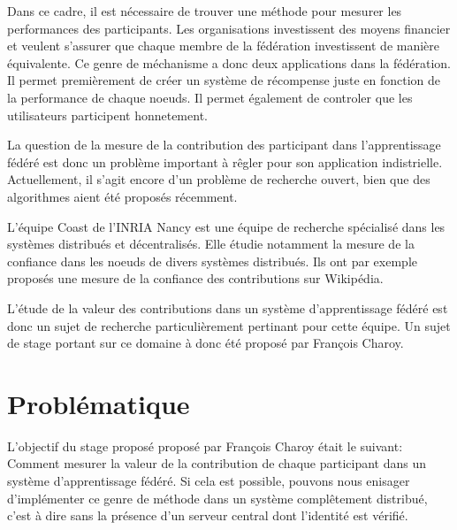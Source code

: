 \documentclass[stage3a]{tnreport} %
\begin{document}
Dans ce cadre, il est nécessaire de trouver une méthode pour mesurer les performances des participants. Les organisations investissent des moyens financier et veulent s'assurer que chaque membre de la fédération investissent de manière équivalente.  Ce genre de méchanisme a donc deux applications dans la fédération. Il permet premièrement de créer un système de récompense juste en fonction de la performance de chaque noeuds. Il permet également de controler que les utilisateurs participent honnetement.

La question de la mesure de la contribution des participant dans l'apprentissage fédéré est donc un problème important à rêgler pour son application indistrielle. Actuellement, il s'agit encore d'un problème de recherche ouvert, bien que des algorithmes aient été proposés récemment.


L'équipe Coast de l'INRIA Nancy est une équipe de recherche spécialisé dans les systèmes distribués et décentralisés. Elle étudie notamment la mesure de la confiance dans les noeuds de divers systèmes distribués. Ils ont par exemple proposés une mesure de la confiance des contributions sur Wikipédia.

L'étude de la valeur des contributions dans un système d'apprentissage fédéré est donc un sujet de recherche particulièrement pertinant pour cette équipe. Un sujet de stage portant sur ce domaine à donc été proposé par François Charoy.





\cleardoublepage


\chapter{Problématique}

L'objectif du stage proposé proposé par François Charoy était le suivant: Comment mesurer la valeur de la contribution de chaque participant dans un système d'apprentissage fédéré.
Si cela est possible, pouvons nous enisager d'implémenter ce genre de méthode dans un système complêtement distribué, c'est à dire sans la présence d'un serveur central dont l'identité est vérifié. 
\end{document}
